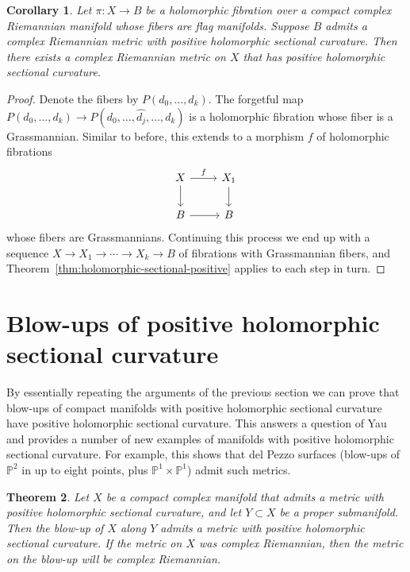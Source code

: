\documentclass[10pt,a4paper]{amsart}
\newtheorem{theo}{Theorem}[section]
\newtheorem{coro}[theo]{Corollary}
\theoremstyle{definition}
\newcommand{\kk}[1]{\mathbb{#1}}
\def\kahler{complex Riemannian}
\begin{document}
\begin{coro}
Let $\pi : X \to B$ be a holomorphic fibration over a compact \kahler{} manifold whose fibers are flag manifolds.
Suppose $B$ admits a \kahler{} metric with positive holomorphic sectional curvature.
Then there exists a \kahler{} metric on $X$ that has positive holomorphic sectional curvature.
\end{coro}

\begin{proof}
Denote the fibers by $P(d_{0}, \ldots, d_{k})$.
The forgetful map $P(d_{0}, \ldots, d_{k}) \to P(d_{0}, \ldots, \hat{d_{j}}, \ldots, d_{k})$ is a holomorphic fibration whose fiber is a Grassmannian.
Similar to before, this extends to a morphism $f$ of holomorphic fibrations
\[
\begin{tikzcd}
  X \ar[r,"f"]\ar[d] & X_{1} \ar[d]
  \\
  B \ar[r] & B
\end{tikzcd}
\]
whose fibers are Grassmannians.
Continuing this process we end up with a sequence $X \to X_{1} \to \cdots \to X_{k} \to B$ of fibrations with Grassmannian fibers, and Theorem~\ref{thm:holomorphic-sectional-positive} applies to each step in turn.
\end{proof}




\section{Blow-ups of positive holomorphic sectional curvature}
\label{sec:blow-ups-positive}


By essentially repeating the arguments of the previous section we can prove that blow-ups of compact manifolds with positive holomorphic sectional curvature have positive holomorphic sectional curvature.
This answers a question of Yau~\cite[Problem~67]{yau1993open}
and provides a number of new examples of manifolds with positive holomorphic sectional curvature.
For example, this shows that del Pezzo surfaces (blow-ups of $\kk P^2$ in up to eight points, plus $\kk P^1 \times \kk P^1$) admit such metrics.


\begin{theo}
Let $X$ be a compact complex manifold that admits a metric with positive holomorphic sectional curvature, and let $Y \subset X$ be a proper submanifold.
Then the blow-up of $X$ along $Y$ admits a metric with positive holomorphic sectional curvature.
If the metric on $X$ was \kahler{}, then the metric on the blow-up will be \kahler{}.
\end{theo}
\end{document}
